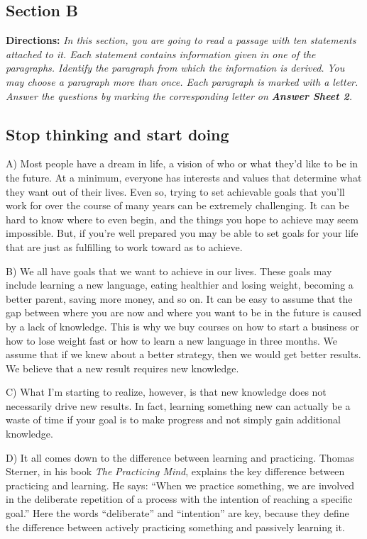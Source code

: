 \documentclass[UTF8,11pt]{ctexart}
\begin{document}
\subsection*{\textbf{Section B}}


\textbf{Directions:} \textit{In this section, you are going to read a passage with ten statements attached to it. Each statement} \textit{contains information given in one of the paragraphs. Identify the paragraph from which the information is derived.} \textit{You may choose a paragraph more than once. Each paragraph is marked with a letter. Answer the questions by} \textit{marking the corresponding letter on }\textbf{\textit{Answer Sheet 2}}\textit{.}


\subsection*{\textbf{Stop thinking and start doing}}


A) Most people have a dream in life, a vision of who or what they’d like to be in the future. At a minimum, everyone has interests and values that determine what they want out of their lives. Even so, trying to set achievable goals that you’ll work for over the course of many years can be extremely challenging. It can be hard to know where to even begin, and the things you hope to achieve may seem impossible. But, if you’re well prepared you may be able to set goals for your life that are just as fulfilling to work toward as to achieve.


B) We all have goals that we want to achieve in our lives. These goals may include learning a new language, eating healthier and losing weight, becoming a better parent, saving more money, and so on. It can be easy to assume that the gap between where you are now and where you want to be in the future is caused by a lack of knowledge. This is why we buy courses on how to start a business or how to lose weight fast or how to learn a new language in three months. We assume that if we knew about a better strategy, then we would get better results. We believe that a new result requires new knowledge.


C) What I’m starting to realize, however, is that new knowledge does not necessarily drive new results. In fact, learning something new can actually be a waste of time if your goal is to make progress and not simply gain additional knowledge.


D) It all comes down to the difference between learning and practicing. Thomas Sterner, in his book \textit{The} \textit{Practicing Mind}, explains the key difference between practicing and learning. He says: “When we practice something, we are involved in the deliberate repetition of a process with the intention of reaching a specific goal.” Here the words “deliberate” and “intention” are key, because they define the difference between actively practicing something and passively learning it.
\end{document}
